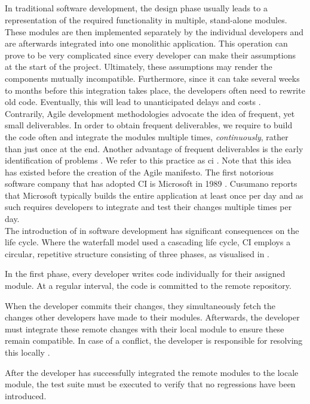 
\subsection{\CI}
In traditional software development, the design phase usually leads to a representation of the required functionality in multiple, stand-alone modules. These modules are then implemented separately by the individual developers and are afterwards integrated into one monolithic application. This operation can prove to be very complicated since every developer can make their assumptions at the start of the project. Ultimately, these assumptions may render the components mutually incompatible. Furthermore, since it can take several weeks to months before this integration takes place, the developers often need to rewrite old code. Eventually, this will lead to unanticipated delays and costs \cite{SmartJenkinsDefinitive}.\\

\noindent Contrarily, Agile development methodologies advocate the idea of frequent, yet small deliverables. In order to obtain frequent deliverables, we require to build the code often and integrate the modules multiple times, \emph{continuously}, rather than just once at the end. Another advantage of frequent deliverables is the early identification of problems \cite{gitlabci}. We refer to this practice as \acrfull{ci} \cite{SmartJenkinsDefinitive}. Note that this idea has existed before the creation of the Agile manifesto. The first notorious software company that has adopted CI is Microsoft in 1989 \cite{cusumanomicrosoft}. Cusumano reports that Microsoft typically builds the entire application at least once per day and as such requires developers to integrate and test their changes multiple times per day.\\

\noindent The introduction of \CI{} in software development has significant consequences on the life cycle. Where the waterfall model used a cascading life cycle, CI employs a circular, repetitive structure consisting of three phases, as visualised in .

\begin{enumerate}
	 In the first phase, every developer writes code individually for their assigned module. At a regular interval, the code is committed to the remote repository.
	
	 When the developer commits their changes, they simultaneously fetch the changes other developers have made to their modules. Afterwards, the developer must integrate these remote changes with their local module to ensure these remain compatible. In case of a conflict, the developer is responsible for resolving this locally \cite{martin2014}.
	
	 After the developer has successfully integrated the remote modules to the locale module, the test suite must be executed to verify that no regressions have been introduced.
\end{enumerate}

